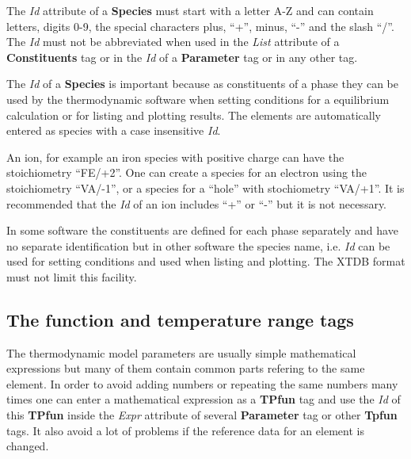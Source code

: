 \documentclass{article}
\begin{document}
The {\em Id} attribute of a {\bf Species} must start with a letter A-Z
and can contain letters, digits 0-9, the special characters plus,
``+'', minus, ``-'' and the slash ``/''.  The {\em Id} must not be
abbreviated when used in the {\em List} attribute of a {\bf
  Constituents} tag or in the {\em Id} of a {\bf Parameter} tag or in
any other tag.

The {\em Id} of a {\bf Species} is important because as constituents
of a phase they can be used by the thermodynamic software when setting
conditions for a equilibrium calculation or for listing and plotting
results.  The elements are automatically entered as species with a
case insensitive {\em Id}.

An ion, for example an iron species with positive charge can have the
stoichiometry ``FE/+2''.  One can create a species for an electron
using the stoichiometry ``VA/-1'', or a species for a ``hole'' with
stochiometry ``VA/+1''.  It is recommended that the {\em Id} of an ion
includes ``+'' or ``-'' but it is not necessary.

In some software the constituents are defined for each phase
separately and have no separate identification but in other software
the species name, i.e. {\em Id} can be used for setting conditions and
used when listing and plotting.  The XTDB format must not limit this
facility.

\newpage

\subsection{The function and temperature range tags}\label{sec:tpfun}

The thermodynamic model parameters are usually simple mathematical
expressions but many of them contain common parts refering to the same
element.  In order to avoid adding numbers or repeating the same
numbers many times one can enter a mathematical expression as a {\bf
  TPfun} tag and use the {\em Id} of this {\bf TPfun} inside the {\em
  Expr} attribute of several {\bf Parameter} tag or other {\bf Tpfun}
tags.  It also avoid a lot of problems if the reference data for an
element is changed.
\end{document}
